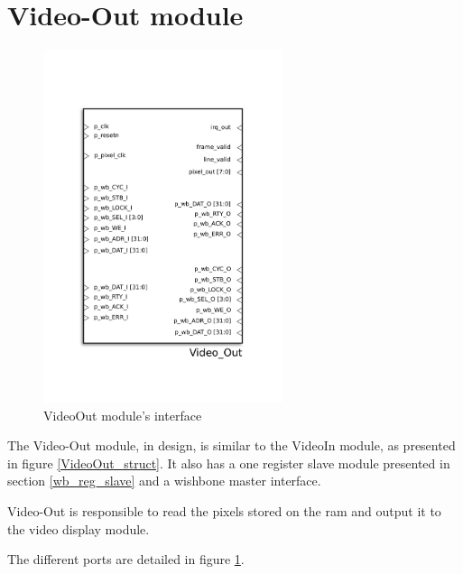 
\section{Video-Out module}

\begin{figure}[H]
\center
\includegraphics[width=7cm]{figs/Video_out.pdf}
\caption{VideoOut module's interface}
\label{VideoOut_interface}
\end{figure}

The Video-Out module, in design, is similar to the VideoIn module, as presented in figure \ref{VideoOut_struct}. It also has a one register slave module presented in section \ref{wb_reg_slave} and a wishbone master interface.


Video-Out is responsible to read the pixels stored on the ram and output it to the video display module.

The different ports are detailed in figure \ref{VideoOut_interface}.


